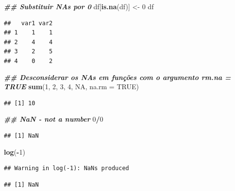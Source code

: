 \documentclass[
]{article}
\newenvironment{Shaded}{\begin{snugshade}}{\end{snugshade}}
\newcommand{\AttributeTok}[1]{\textcolor[rgb]{0.13,0.29,0.53}{#1}}
\newcommand{\ConstantTok}[1]{\textcolor[rgb]{0.56,0.35,0.01}{#1}}
\newcommand{\DecValTok}[1]{\textcolor[rgb]{0.00,0.00,0.81}{#1}}
\newcommand{\DocumentationTok}[1]{\textcolor[rgb]{0.56,0.35,0.01}{\textbf{\textit{#1}}}}
\newcommand{\FunctionTok}[1]{\textcolor[rgb]{0.13,0.29,0.53}{\textbf{#1}}}
\newcommand{\NormalTok}[1]{#1}
\newcommand{\OtherTok}[1]{\textcolor[rgb]{0.56,0.35,0.01}{#1}}
\newcommand{\SpecialCharTok}[1]{\textcolor[rgb]{0.81,0.36,0.00}{\textbf{#1}}}
\begin{document}
\begin{Shaded}
\begin{Highlighting}[]
\DocumentationTok{\#\# Substituir NAs por 0}
\NormalTok{df[}\FunctionTok{is.na}\NormalTok{(df)] }\OtherTok{\textless{}{-}} \DecValTok{0}
\NormalTok{df}
\end{Highlighting}
\end{Shaded}

\begin{verbatim}
##   var1 var2
## 1    1    1
## 2    4    4
## 3    2    5
## 4    0    2
\end{verbatim}

\begin{Shaded}
\begin{Highlighting}[]
\DocumentationTok{\#\# Desconsiderar os NAs em funções com o argumento rm.na = TRUE}
\FunctionTok{sum}\NormalTok{(}\DecValTok{1}\NormalTok{, }\DecValTok{2}\NormalTok{, }\DecValTok{3}\NormalTok{, }\DecValTok{4}\NormalTok{, }\ConstantTok{NA}\NormalTok{, }\AttributeTok{na.rm =} \ConstantTok{TRUE}\NormalTok{)}
\end{Highlighting}
\end{Shaded}

\begin{verbatim}
## [1] 10
\end{verbatim}

\begin{Shaded}
\begin{Highlighting}[]
\DocumentationTok{\#\# NaN {-} not a number}
\DecValTok{0}\SpecialCharTok{/}\DecValTok{0}
\end{Highlighting}
\end{Shaded}

\begin{verbatim}
## [1] NaN
\end{verbatim}

\begin{Shaded}
\begin{Highlighting}[]
\FunctionTok{log}\NormalTok{(}\SpecialCharTok{{-}}\DecValTok{1}\NormalTok{)}
\end{Highlighting}
\end{Shaded}

\begin{verbatim}
## Warning in log(-1): NaNs produced
\end{verbatim}

\begin{verbatim}
## [1] NaN
\end{verbatim}
\end{document}
